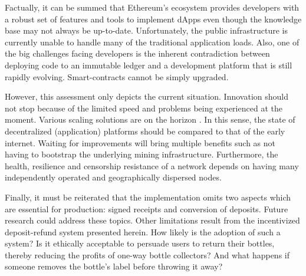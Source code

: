 
Factually, it can be summed that Ethereum's ecosystem provides developers with a robust set of features and tools to implement \acp{dApp} even though the knowledge base may not always be up-to-date. Unfortunately, the public infrastructure is currently unable to handle many of the traditional application loads. Also, one of the big challenges facing developers is the inherent contradiction between deploying code to an immutable ledger and a development platform that is still rapidly evolving. Smart-contracts cannot be simply upgraded. 

However, this assessment only depicts the current situation. Innovation should not stop because of the limited speed and problems being experienced at the moment. Various scaling solutions are on the horizon \cite{scalingEthereum}. In this sense, the state of decentralized (application) platforms should be compared to that of the early internet. Waiting for improvements will bring multiple benefits such as not having to bootstrap the underlying mining infrastructure. Furthermore, the health, resilience and censorship resistance of a network depends on having many independently operated and geographically dispersed nodes.

Finally, it must be reiterated that the implementation omits two aspects which are essential for production: signed receipts and conversion of deposits. Future research could address these topics. Other limitations result from the incentivized deposit-refund system presented herein. How likely is the adoption of such a system? Is it ethically acceptable to persuade users to return their bottles, thereby reducing the profits of one-way bottle collectors? And what happens if someone removes the bottle's label before throwing it away?



